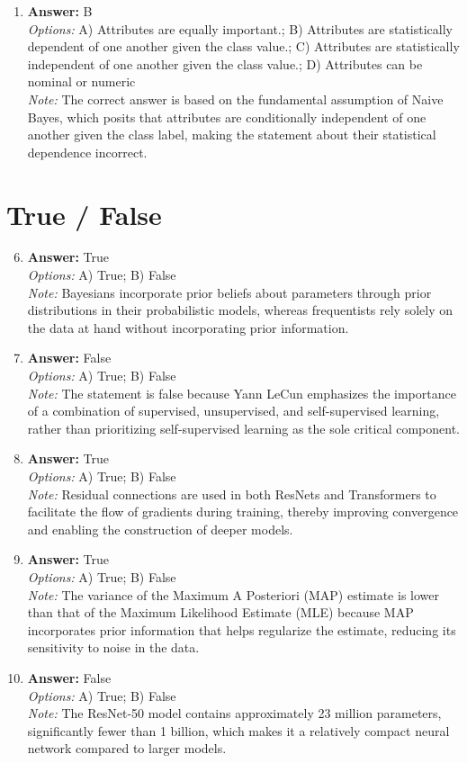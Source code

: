 \documentclass[12pt]{article}
\begin{document}
\begin{enumerate}[label=\arabic*.]
\item \textbf{Answer:} B
\\ \textit{Options:} A) Attributes are equally important.; B) Attributes are statistically dependent of one another given the class value.; C) Attributes are statistically independent of one another given the class value.; D) Attributes can be nominal or numeric
\\ \textit{Note:} The correct answer is based on the fundamental assumption of Naive Bayes, which posits that attributes are conditionally independent of one another given the class label, making the statement about their statistical dependence incorrect.
\end{enumerate}

\section*{True / False}
\begin{enumerate}[label=\arabic*.]
\setcounter{enumi}{5}
\item \textbf{Answer:} True
\\ \textit{Options:} A) True; B) False
\\ \textit{Note:} Bayesians incorporate prior beliefs about parameters through prior distributions in their probabilistic models, whereas frequentists rely solely on the data at hand without incorporating prior information.
\item \textbf{Answer:} False
\\ \textit{Options:} A) True; B) False
\\ \textit{Note:} The statement is false because Yann LeCun emphasizes the importance of a combination of supervised, unsupervised, and self-supervised learning, rather than prioritizing self-supervised learning as the sole critical component.
\item \textbf{Answer:} True
\\ \textit{Options:} A) True; B) False
\\ \textit{Note:} Residual connections are used in both ResNets and Transformers to facilitate the flow of gradients during training, thereby improving convergence and enabling the construction of deeper models.
\item \textbf{Answer:} True
\\ \textit{Options:} A) True; B) False
\\ \textit{Note:} The variance of the Maximum A Posteriori (MAP) estimate is lower than that of the Maximum Likelihood Estimate (MLE) because MAP incorporates prior information that helps regularize the estimate, reducing its sensitivity to noise in the data.
\item \textbf{Answer:} False
\\ \textit{Options:} A) True; B) False
\\ \textit{Note:} The ResNet-50 model contains approximately 23 million parameters, significantly fewer than 1 billion, which makes it a relatively compact neural network compared to larger models.
\end{enumerate}
\end{document}
